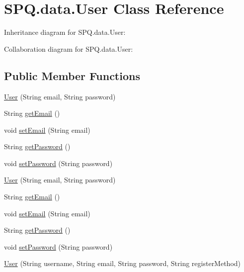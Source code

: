 \hypertarget{class_s_p_q_1_1data_1_1_user}{}\section{S\+P\+Q.\+data.\+User Class Reference}
\label{class_s_p_q_1_1data_1_1_user}


Inheritance diagram for S\+P\+Q.\+data.\+User\+:


Collaboration diagram for S\+P\+Q.\+data.\+User\+:
\subsection*{Public Member Functions}
\begin{DoxyCompactItemize}
\item 
\mbox{\hyperlink{class_s_p_q_1_1data_1_1_user_acc8d4cd3f95c3da8a14117c6057a3e8b}{User}} (String email, String password)
\item 
String \mbox{\hyperlink{class_s_p_q_1_1data_1_1_user_a4f3ae0062ee7529314a5b791707ff4b4}{get\+Email}} ()
\item 
void \mbox{\hyperlink{class_s_p_q_1_1data_1_1_user_ab7132f971882fb88afc6999cf5473ef4}{set\+Email}} (String email)
\item 
String \mbox{\hyperlink{class_s_p_q_1_1data_1_1_user_a688c1eadd21594d52967d87289e23ce2}{get\+Password}} ()
\item 
void \mbox{\hyperlink{class_s_p_q_1_1data_1_1_user_aa5bcf362d3c9c4746f406239bcb041f5}{set\+Password}} (String password)
\item 
\mbox{\hyperlink{class_s_p_q_1_1data_1_1_user_acc8d4cd3f95c3da8a14117c6057a3e8b}{User}} (String email, String password)
\item 
String \mbox{\hyperlink{class_s_p_q_1_1data_1_1_user_a4f3ae0062ee7529314a5b791707ff4b4}{get\+Email}} ()
\item 
void \mbox{\hyperlink{class_s_p_q_1_1data_1_1_user_ab7132f971882fb88afc6999cf5473ef4}{set\+Email}} (String email)
\item 
String \mbox{\hyperlink{class_s_p_q_1_1data_1_1_user_a688c1eadd21594d52967d87289e23ce2}{get\+Password}} ()
\item 
void \mbox{\hyperlink{class_s_p_q_1_1data_1_1_user_aa5bcf362d3c9c4746f406239bcb041f5}{set\+Password}} (String password)
\item 
\mbox{\hyperlink{class_s_p_q_1_1data_1_1_user_a7e0244e513a080fbe8e77cbd07b74e53}{User}} (String username, String email, String password, String register\+Method)

\end{DoxyCompactItemize}
